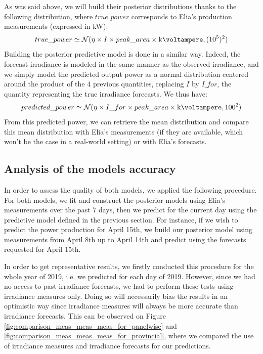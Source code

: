 \documentclass[a4paper, 12pt]{article}
\begin{document}
As was said above, we will build their posterior distributions thanks to the following distribution, where $true\_power$ corresponds to Elia's production measurements (expressed in \si{\kilo\watt}):
\begin{equation*}
    true\_power \simeq \mathcal{N}(\eta \times I \times peak\_area \times \si{\kilo\voltampere}, (10^5)^2)
\end{equation*}
Building the posterior predictive model is done in a similar way. Indeed, the forecast irradiance is modeled in the same manner as the observed irradiance, and we simply model the predicted output power as a normal distribution centered around the product of the 4 previous quantities, replacing $I$ by $I\_for$, the quantity representing the true irradiance forecasts. We thus have:
\begin{equation*}
    predicted\_power \simeq \mathcal{N}(\eta \times I\_for \times peak\_area \times \si{\kilo\voltampere}, 100^2)
\end{equation*}
From this predicted power, we can retrieve the mean distribution and compare this mean distribution with Elia's measurements (if they are available, which won't be the case in a real-world setting) or with Elia's forecasts.

\subsection{Analysis of the models accuracy}
In order to assess the quality of both models, we applied the following procedure. For both models, we fit and construct the posterior models using Elia's measurements over the past 7 days, then we predict for the current day using the predictive model defined in the previous section. For instance, if we wish to predict the power production for April 15th, we build our posterior model using measurements from April 8th up to April 14th and predict using the forecasts requested for April 15th.

In order to get representative results, we firstly conducted this procedure for the whole year of 2019, i.e. we predicted for each day of 2019. However, since we had no access to past irradiance forecasts, we had to perform these tests using irradiance measures only. Doing so will necessarily bias the results in an optimistic way since irradiance measures will always be more accurate than irradiance forecasts. This can be observed on Figure \ref{fig:comparison_meas_meas_meas_for_panelwise} and \ref{fig:comparison_meas_meas_meas_for_provincial}, where we compared the use of irradiance measures and irradiance forecasts for our predictions.
\end{document}
